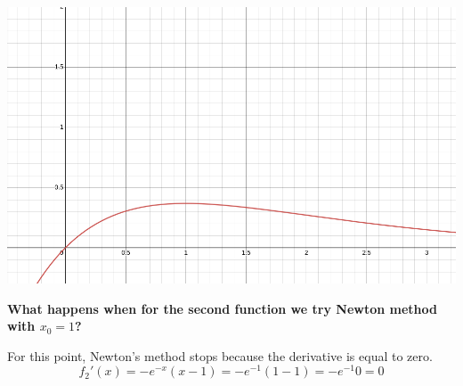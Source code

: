 \documentclass{article}
\begin{document}
\begin{center}
    \includegraphics[scale=0.2]{first_function}
\end{center}

\begin{center}
    \textbf{What happens when for the second function we try Newton method with \textit{\(x_0 = 1\)}?}
\end{center}
For this point, Newton's method stops because the derivative is equal to zero.
\[
    f_2'(x) = -e^{-x}(x - 1) = -e^{-1}(1 - 1) = -e^{-1}0 = 0
\]
\end{document}
